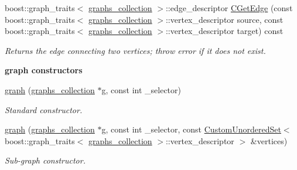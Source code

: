 \begin{DoxyCompactItemize}
boost\+::graph\+\_\+traits$<$ \hyperlink{structgraphs__collection}{graphs\+\_\+collection} $>$\+::edge\+\_\+descriptor \hyperlink{structgraph_afd6fd622c1f31f8b21da7b46bc1d5dba}{C\+Get\+Edge} (const boost\+::graph\+\_\+traits$<$ \hyperlink{structgraphs__collection}{graphs\+\_\+collection} $>$\+::vertex\+\_\+descriptor source, const boost\+::graph\+\_\+traits$<$ \hyperlink{structgraphs__collection}{graphs\+\_\+collection} $>$\+::vertex\+\_\+descriptor target) const
\begin{DoxyCompactList}\small\item\em Returns the edge connecting two vertices; throw error if it does not exist. \end{DoxyCompactList}\end{DoxyCompactItemize}
\begin{Indent}\textbf{ graph constructors}\par
\begin{DoxyCompactItemize}
\item 
\hyperlink{structgraph_a3a867374679e408a73742d38282cef0b}{graph} (\hyperlink{structgraphs__collection}{graphs\+\_\+collection} $\ast$g, const int \+\_\+selector)
\begin{DoxyCompactList}\small\item\em Standard constructor. \end{DoxyCompactList}\item 
\hyperlink{structgraph_ae1d03c89ac36e0008933e1e37459417b}{graph} (\hyperlink{structgraphs__collection}{graphs\+\_\+collection} $\ast$g, const int \+\_\+selector, const \hyperlink{classCustomUnorderedSet}{Custom\+Unordered\+Set}$<$ boost\+::graph\+\_\+traits$<$ \hyperlink{structgraphs__collection}{graphs\+\_\+collection} $>$\+::vertex\+\_\+descriptor $>$ \&vertices)
\begin{DoxyCompactList}\small\item\em Sub-\/graph constructor. \end{DoxyCompactList}\end{DoxyCompactItemize}
\end{Indent}
